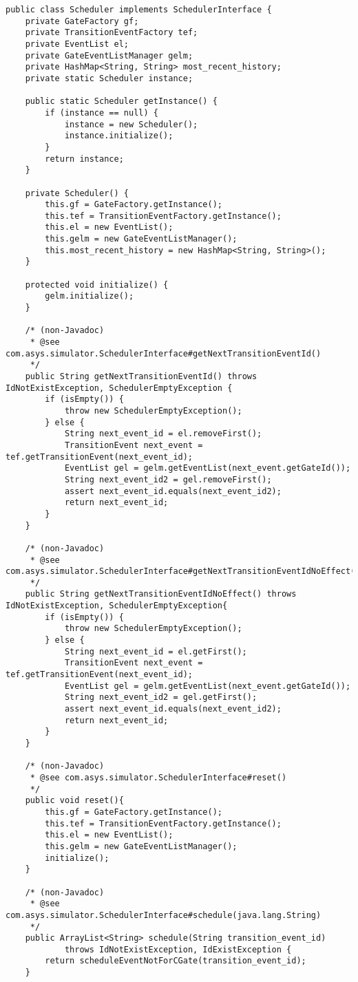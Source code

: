 \begin{lstlisting}[caption=Scheduler, label=listing8]
public class Scheduler implements SchedulerInterface {
	private GateFactory gf;
	private TransitionEventFactory tef;
	private EventList el;
	private GateEventListManager gelm;
	private HashMap<String, String> most_recent_history;
	private static Scheduler instance;

	public static Scheduler getInstance() {
		if (instance == null) {
			instance = new Scheduler();
			instance.initialize();
		}
		return instance;
	}

	private Scheduler() {
		this.gf = GateFactory.getInstance();
		this.tef = TransitionEventFactory.getInstance();
		this.el = new EventList();
		this.gelm = new GateEventListManager();
		this.most_recent_history = new HashMap<String, String>();
	}

	protected void initialize() {
		gelm.initialize();
	}

	/* (non-Javadoc)
	 * @see com.asys.simulator.SchedulerInterface#getNextTransitionEventId()
	 */
	public String getNextTransitionEventId() throws IdNotExistException, SchedulerEmptyException {
		if (isEmpty()) {
			throw new SchedulerEmptyException();
		} else {
			String next_event_id = el.removeFirst();
			TransitionEvent next_event = tef.getTransitionEvent(next_event_id);
			EventList gel = gelm.getEventList(next_event.getGateId());
			String next_event_id2 = gel.removeFirst();
			assert next_event_id.equals(next_event_id2);
			return next_event_id;
		}
	}
	
	/* (non-Javadoc)
	 * @see com.asys.simulator.SchedulerInterface#getNextTransitionEventIdNoEffect()
	 */
	public String getNextTransitionEventIdNoEffect() throws IdNotExistException, SchedulerEmptyException{
		if (isEmpty()) {
			throw new SchedulerEmptyException();
		} else {
			String next_event_id = el.getFirst();
			TransitionEvent next_event = tef.getTransitionEvent(next_event_id);
			EventList gel = gelm.getEventList(next_event.getGateId());
			String next_event_id2 = gel.getFirst();
			assert next_event_id.equals(next_event_id2);
			return next_event_id;
		}
	}
	
	/* (non-Javadoc)
	 * @see com.asys.simulator.SchedulerInterface#reset()
	 */
	public void reset(){
		this.gf = GateFactory.getInstance();
		this.tef = TransitionEventFactory.getInstance();
		this.el = new EventList();
		this.gelm = new GateEventListManager();
		initialize();
	}

	/* (non-Javadoc)
	 * @see com.asys.simulator.SchedulerInterface#schedule(java.lang.String)
	 */
	public ArrayList<String> schedule(String transition_event_id)
			throws IdNotExistException, IdExistException {
		return scheduleEventNotForCGate(transition_event_id);
	}


\end{lstlisting}
